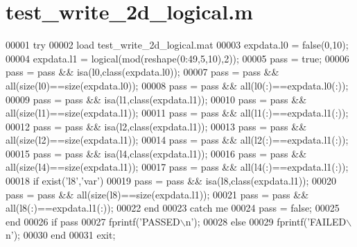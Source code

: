 \hypertarget{test__write__2d__logical_8m_source}{}\section{test\+\_\+write\+\_\+2d\+\_\+logical.\+m}
\label{test__write__2d__logical_8m_source}

\begin{DoxyCode}
00001 \textcolor{keywordflow}{try}
00002     load test\_write\_2d\_logical.mat
00003     expdata.l0 = \textcolor{keyword}{false}(0,10);
00004     expdata.l1 = logical(mod(reshape(0:49,5,10),2));
00005     pass = \textcolor{keyword}{true};
00006     pass = pass && isa(l0,\textcolor{keyword}{class}(expdata.l0));
00007     pass = pass && all(size(l0)==size(expdata.l0));
00008     pass = pass && all(l0(:)==expdata.l0(:));
00009     pass = pass && isa(l1,\textcolor{keyword}{class}(expdata.l1));
00010     pass = pass && all(size(l1)==size(expdata.l1));
00011     pass = pass && all(l1(:)==expdata.l1(:));
00012     pass = pass && isa(l2,\textcolor{keyword}{class}(expdata.l1));
00013     pass = pass && all(size(l2)==size(expdata.l1));
00014     pass = pass && all(l2(:)==expdata.l1(:));
00015     pass = pass && isa(l4,\textcolor{keyword}{class}(expdata.l1));
00016     pass = pass && all(size(l4)==size(expdata.l1));
00017     pass = pass && all(l4(:)==expdata.l1(:));
00018     \textcolor{keywordflow}{if} exist(\textcolor{stringliteral}{'l8'},\textcolor{stringliteral}{'var'})
00019         pass = pass && isa(l8,class(expdata.l1));
00020         pass = pass && all(size(l8)==size(expdata.l1));
00021         pass = pass && all(l8(:)==expdata.l1(:));
00022     end
00023 catch me
00024     pass = false;
00025 end
00026 if pass
00027     fprintf('PASSED\(\backslash\)n');
00028 else
00029     fprintf('FAILED\(\backslash\)n');
00030 end
00031 exit;
\end{DoxyCode}
